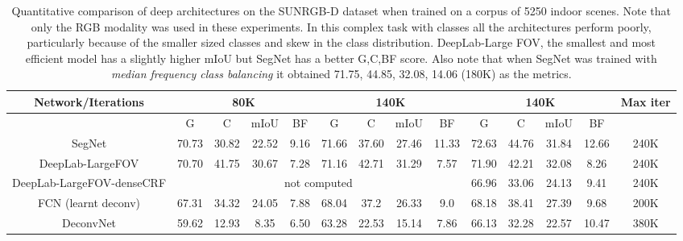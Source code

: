 \documentclass[10pt,journal,compsoc]{IEEEtran}
\begin{document}
\begin{table*}[t]
	\centering
	\tabcolsep=2pt
	\begin{tabular}{|c|c|c|c|c||c|c|c|c||c|c|c|c|c|}
		\hline
		Network/Iterations       & \multicolumn{4}{c||}{80K} & \multicolumn{4}{c||}{140K} & \multicolumn{4}{c|}{140K} & Max iter  \\ \hline \hline
		& G & C & mIoU & BF & G & C & mIoU & BF & G & C & mIoU & BF  &\\ \hline 
		
		SegNet   &70.73  & 30.82 & 22.52 & 9.16  &71.66  &37.60  &27.46  & 11.33 & 72.63 & 44.76 & 31.84 & 12.66 & 240K\\ \hline
		DeepLab-LargeFOV \cite{liang2015semantic}&70.70 &41.75 &30.67 &7.28 &71.16 & 42.71 & 31.29 & 7.57 & 71.90 & 42.21 & 32.08 & 8.26 & 240K\\ \hline
		DeepLab-LargeFOV-denseCRF \cite{liang2015semantic}& \multicolumn{8}{c|}{not computed} & 66.96 & 33.06 & 24.13& 9.41 & 240K \\ \hline
		FCN (learnt deconv) \cite{FCN}& 67.31 & 34.32 & 24.05 & 7.88 & 68.04 & 37.2 & 26.33 & 9.0 & 68.18 & 38.41 & 27.39 & 9.68 & 200K \\  \hline
		DeconvNet \cite{noh2015learning}& 59.62 & 12.93 & 8.35 & 6.50 & 63.28 & 22.53 & 15.14 & 7.86 & 66.13 & 32.28 & 22.57 & 10.47 & 380K \\ \hline 
	\end{tabular}
	\vspace*{0.1cm}
	\caption{\footnotesize{Quantitative comparison of deep architectures on the SUNRGB-D dataset when trained on a corpus of 5250 indoor scenes. Note that only the RGB modality was used in these experiments. In this complex task with  classes all the architectures perform poorly, particularly because of the smaller sized classes and skew in the class distribution. DeepLab-Large FOV, the smallest and most efficient model has a slightly higher mIoU but SegNet has a better G,C,BF score. Also note that when SegNet was trained with \textit{median frequency class balancing} it obtained 71.75, 44.85, 32.08, 14.06 (180K) as the metrics.}}
	\label{SUNRGBBenchmark}
\end{table*}
\end{document}
